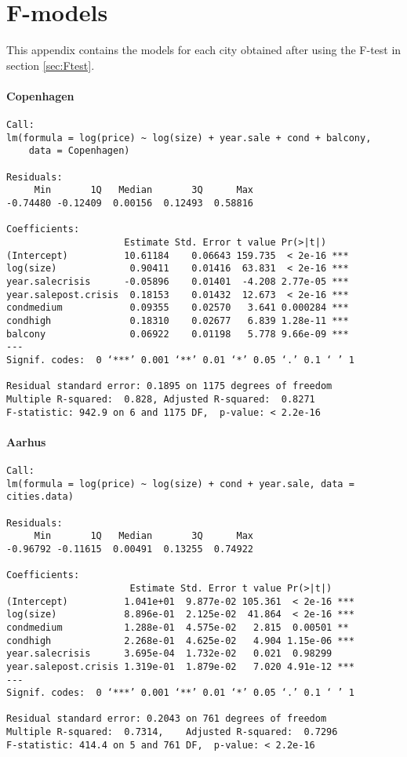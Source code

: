 \chapter{F-models}

This appendix contains the models for each city obtained after using the F-test in section \ref{sec:Ftest}.

\subsubsection{Copenhagen}
\begin{lstlisting}
Call:
lm(formula = log(price) ~ log(size) + year.sale + cond + balcony, 
    data = Copenhagen)

Residuals:
     Min       1Q   Median       3Q      Max 
-0.74480 -0.12409  0.00156  0.12493  0.58816 

Coefficients:
                     Estimate Std. Error t value Pr(>|t|)    
(Intercept)          10.61184    0.06643 159.735  < 2e-16 ***
log(size)             0.90411    0.01416  63.831  < 2e-16 ***
year.salecrisis      -0.05896    0.01401  -4.208 2.77e-05 ***
year.salepost.crisis  0.18153    0.01432  12.673  < 2e-16 ***
condmedium            0.09355    0.02570   3.641 0.000284 ***
condhigh              0.18310    0.02677   6.839 1.28e-11 ***
balcony               0.06922    0.01198   5.778 9.66e-09 ***
---
Signif. codes:  0 ‘***’ 0.001 ‘**’ 0.01 ‘*’ 0.05 ‘.’ 0.1 ‘ ’ 1

Residual standard error: 0.1895 on 1175 degrees of freedom
Multiple R-squared:  0.828,	Adjusted R-squared:  0.8271 
F-statistic: 942.9 on 6 and 1175 DF,  p-value: < 2.2e-16
\end{lstlisting}

\subsubsection{Aarhus}
\begin{lstlisting}
Call:
lm(formula = log(price) ~ log(size) + cond + year.sale, data = cities.data)

Residuals:
     Min       1Q   Median       3Q      Max 
-0.96792 -0.11615  0.00491  0.13255  0.74922 

Coefficients:
                      Estimate Std. Error t value Pr(>|t|)    
(Intercept)          1.041e+01  9.877e-02 105.361  < 2e-16 ***
log(size)            8.896e-01  2.125e-02  41.864  < 2e-16 ***
condmedium           1.288e-01  4.575e-02   2.815  0.00501 ** 
condhigh             2.268e-01  4.625e-02   4.904 1.15e-06 ***
year.salecrisis      3.695e-04  1.732e-02   0.021  0.98299    
year.salepost.crisis 1.319e-01  1.879e-02   7.020 4.91e-12 ***
---
Signif. codes:  0 ‘***’ 0.001 ‘**’ 0.01 ‘*’ 0.05 ‘.’ 0.1 ‘ ’ 1

Residual standard error: 0.2043 on 761 degrees of freedom
Multiple R-squared:  0.7314,	Adjusted R-squared:  0.7296 
F-statistic: 414.4 on 5 and 761 DF,  p-value: < 2.2e-16
\end{lstlisting}


